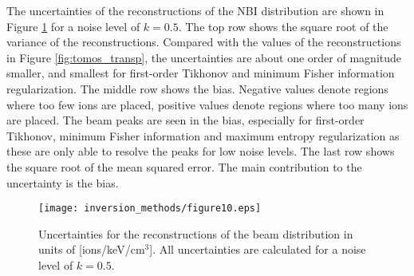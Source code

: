 The uncertainties of the reconstructions of the NBI distribution are shown in Figure \ref{fig:uncertainties_transp} for a noise level of $k=0.5$.
The top row shows the square root of the variance of the reconstructions. 
Compared with the values of the reconstructions in Figure \ref{fig:tomos_transp}, the uncertainties are about one order of magnitude smaller, and smallest for first-order Tikhonov and minimum Fisher information regularization. 
The middle row shows the bias.
Negative values denote regions where too few ions are placed, positive values denote regions where too many ions are placed.
The beam peaks are seen in the bias, especially for first-order Tikhonov, minimum Fisher information and maximum entropy regularization as these are only able to resolve the peaks for low noise levels.
The last row shows the square root of the mean squared error. 
The main contribution to the uncertainty is the bias.
\begin{figure}[h!]
    \centering
    \texttt{[image: inversion\_methods/figure10.eps]}
    \caption{Uncertainties for the reconstructions of the beam distribution in units of [ions/keV/cm$^3$]. All uncertainties are calculated for a noise level of $k=0.5$.}
    \label{fig:uncertainties_transp}
\end{figure}

